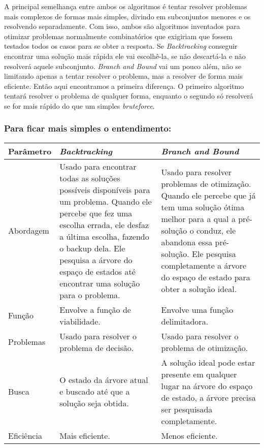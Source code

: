 A principal semelhança entre ambos os algoritmos é tentar resolver problemas
mais complexos de formas mais simples, divindo em subconjuntos menores e
os resolvendo separadamente. Com isso, ambos são algoritmos inventados para otimizar problemas normalmente
combinatórios que exigiriam que fossem testados todos os casos para se obter a 
resposta. Se \emph{Backtracking} conseguir encontrar uma solução mais rápida
ele vai escolhê-la, se não descartá-la e não resolverá aquele subconjunto.
\emph{Branch and Bound} vai um pouco além, não se limitando apenas a tentar resolver
o problema, mas a resolver de forma mais eficiente. Então aqui encontramos a primeira
diferença. O primeiro algoritmo tentará resolver o problema de qualquer forma,
enquanto o segundo só resolverá se for mais rápido do que um simples \emph{bruteforce}.

\subsubsection*{Para ficar mais simples o entendimento:}

\begin{center}
    \begin{tabular}{| m{2cm} | m{4cm} | m{4cm} |}
        \hline
        Parâmetro & \emph{Backtracking} & \emph{Branch and Bound} \\
        \hline
        Abordagem & 
        Usado para encontrar todas as soluções possíveis 
        disponíveis para um problema. Quando ele percebe que fez uma escolha 
        errada, ele desfaz a última escolha, fazendo o backup dela. 
        Ele pesquisa a árvore do espaço de estados até encontrar uma solução 
        para o problema. & 
        Usado para resolver problemas de otimização. Quando ele percebe que 
        já tem uma solução ótima melhor para a qual a pré-solução o conduz, 
        ele abandona essa pré-solução. Ele pesquisa completamente a árvore 
        do espaço de estado para obter a solução ideal. \\
        \hline
        Função &
        Envolve a função de viabilidade. &
        Envolve uma função delimitadora. \\
        \hline
        Problemas &
        Usado para resolver o problema de decisão. &
        Usado para resolver o problema de otimização. \\
        \hline
        Busca &
        O estado da árvore atual e buscado até que a solução seja obtida. &
        A solução ideal pode estar presente em qualquer lugar na árvore do 
        espaço de estado, a árvore precisa ser pesquisada completamente. \\
        \hline
        Eficiência &
        Mais eficiente. &
        Menos eficiente. \\
        \hline
    \end{tabular}
\end{center}
